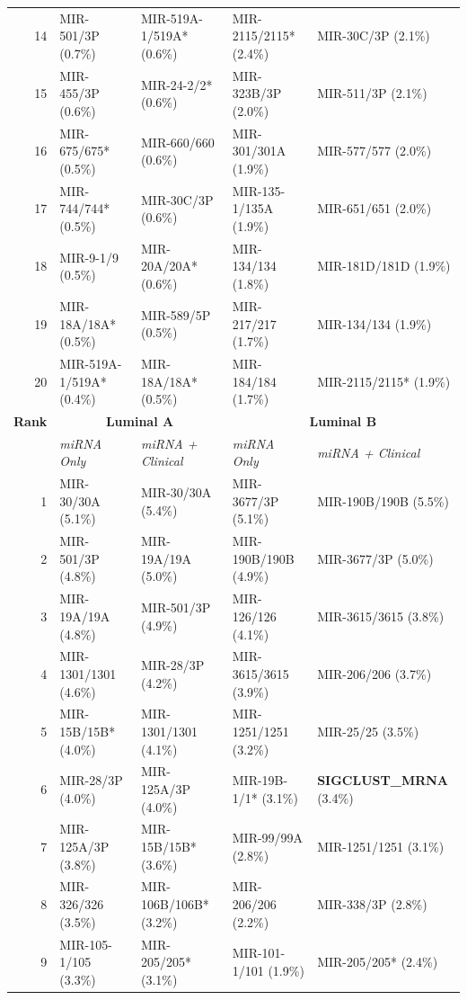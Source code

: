 \begin{table}[!ht]
\begin{tabular}{r|ll|ll}
14 & MIR-501/3P (0.7\%)      & MIR-519A-1/519A* (0.6\%) & MIR-2115/2115* (2.4\%)  & MIR-30C/3P (2.1\%)      \\
15 & MIR-455/3P (0.6\%)      & MIR-24-2/2* (0.6\%)     & MIR-323B/3P (2.0\%)     & MIR-511/3P (2.1\%)      \\
16 & MIR-675/675* (0.5\%)    & MIR-660/660 (0.6\%)     & MIR-301/301A (1.9\%)    & MIR-577/577 (2.0\%)     \\
17 & MIR-744/744* (0.5\%)    & MIR-30C/3P (0.6\%)      & MIR-135-1/135A (1.9\%)  & MIR-651/651 (2.0\%)     \\
18 & MIR-9-1/9 (0.5\%)       & MIR-20A/20A* (0.6\%)    & MIR-134/134 (1.8\%)     & MIR-181D/181D (1.9\%)   \\
19 & MIR-18A/18A* (0.5\%)    & MIR-589/5P (0.5\%)      & MIR-217/217 (1.7\%)     & MIR-134/134 (1.9\%)     \\
20 & MIR-519A-1/519A* (0.4\%) & MIR-18A/18A* (0.5\%)    & MIR-184/184 (1.7\%)     & MIR-2115/2115* (1.9\%)  \\ \hline
\textbf{Rank} & \multicolumn{2}{c|}{\textbf{Luminal A}} & \multicolumn{2}{c}{\textbf{Luminal B}} \\
& \textit{miRNA Only} & \textit{miRNA + Clinical} & \textit{miRNA Only} & \textit{miRNA + Clinical} \\ \hline
1  & MIR-30/30A (5.1\%)     & MIR-30/30A (5.4\%)     & MIR-3677/3P (5.1\%)    & MIR-190B/190B (5.5\%)  \\
2  & MIR-501/3P (4.8\%)     & MIR-19A/19A (5.0\%)    & MIR-190B/190B (4.9\%)  & MIR-3677/3P (5.0\%)    \\
3  & MIR-19A/19A (4.8\%)    & MIR-501/3P (4.9\%)     & MIR-126/126 (4.1\%)    & MIR-3615/3615 (3.8\%)   \\
4  & MIR-1301/1301 (4.6\%)   & MIR-28/3P (4.2\%)       & MIR-3615/3615 (3.9\%)   & MIR-206/206 (3.7\%)     \\
5  & MIR-15B/15B* (4.0\%)    & MIR-1301/1301 (4.1\%)   & MIR-1251/1251 (3.2\%)   & MIR-25/25 (3.5\%)       \\
6  & MIR-28/3P (4.0\%)       & MIR-125A/3P (4.0\%)     & MIR-19B-1/1* (3.1\%)    & \textbf{SIGCLUST\_MRNA} (3.4\%) \\
7  & MIR-125A/3P (3.8\%)     & MIR-15B/15B* (3.6\%)    & MIR-99/99A (2.8\%)      & MIR-1251/1251 (3.1\%)   \\
8  & MIR-326/326 (3.5\%)     & MIR-106B/106B* (3.2\%)  & MIR-206/206 (2.2\%)     & MIR-338/3P (2.8\%)      \\
9  & MIR-105-1/105 (3.3\%)   & MIR-205/205* (3.1\%)    & MIR-101-1/101 (1.9\%)   & MIR-205/205* (2.4\%)    \\

\end{tabular}
\end{table}
